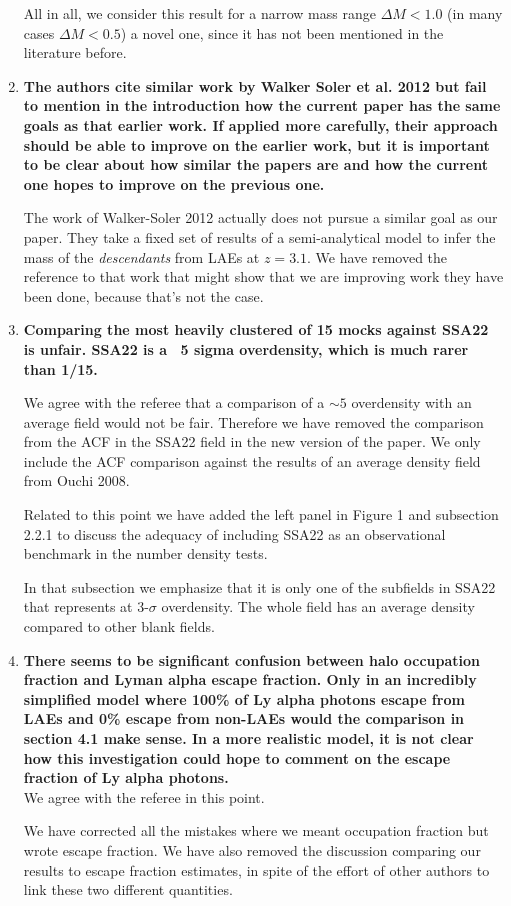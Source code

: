 \documentclass[12pts]{article}
\begin{document}
\begin{enumerate}
  All in all, we consider this result for a narrow
  mass range $\Delta M<1.0$ (in many cases $\Delta M<0.5$) a novel
  one, since it has not been mentioned in the literature before. 

 
  \item {\bf 
    The authors cite similar work by Walker Soler et al. 2012 but fail
    to mention in the introduction how the current paper has the same
    goals as that earlier work.  If applied more carefully, their
    approach should be able to improve on the earlier work, but it is
    important to be clear about how similar the papers are and how the
    current one hopes to improve on the previous one. 
  }
    
The work of Walker-Soler 2012 actually does not pursue a similar goal
as our paper. They take a fixed set of results of a semi-analytical
model to infer the mass of the \emph{descendants} from LAEs at
$z=3.1$. We have removed the reference to that work that might show
that we are improving work they have been done, because that's not the case.

\item {\bf 
Comparing the most heavily clustered of 15 mocks against SSA22 is
  unfair. SSA22 is a ~5 sigma overdensity, which is much rarer than
  1/15. 
  }
  
We agree with the referee that a comparison of a $\sim 5 $ overdensity
with an average field would not be fair. Therefore we have removed
the comparison from the ACF in the SSA22 field in the new version of
the paper. We only include the ACF comparison against the results of
an average density field from Ouchi 2008. 

Related to this point we have added the left panel in Figure 1 and
subsection 2.2.1 to discuss the adequacy of including SSA22 as an
observational benchmark in the number density tests.

In that subsection we emphasize that it is only one of the subfields
in SSA22 that represents at 3-$\sigma$ overdensity. The whole field
has an average density compared to other blank fields.


\item {\bf 
  There seems to be significant confusion between halo occupation
   fraction and Lyman alpha escape fraction.  Only in an incredibly
   simplified model where 100\% of Ly alpha photons escape from LAEs
   and 0\% escape from non-LAEs would the comparison in section 4.1
   make sense.  In a more realistic model, it is not clear how this
   investigation could hope to comment on the escape fraction of Ly
   alpha photons. 
}\\

We agree with the referee in this point.

We have corrected all the mistakes where we meant occupation
fraction but wrote escape fraction. We have also removed the discussion
comparing our results to escape fraction estimates, in spite of the
effort of other authors to link these two different quantities.  

\end{enumerate}
\end{document}
